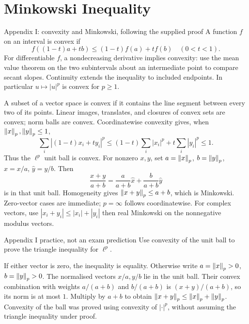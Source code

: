 \clearpage
\section{Minkowski Inequality}
\begin{note}{Appendix I: convexity and Minkowski, following the supplied proof}
A function $f$ on an interval is convex if
\[f((1-t)a+tb)\le(1-t)f(a)+tf(b)\quad(0<t<1).\]
For differentiable $f$, a nondecreasing derivative implies convexity: use the mean value theorem on the two subintervals about an intermediate point to compare secant slopes. Continuity extends the inequality to included endpoints. In particular $u\mapsto|u|^p$ is convex for $p\ge1$.

A subset of a vector space is convex if it contains the line segment between every two of its points. Linear images, translates, and closures of convex sets are convex; norm balls are convex. Coordinatewise convexity gives, when $\left\lVert x\right\rVert_p,\left\lVert y\right\rVert_p\le1$,
\[\sum_i|(1-t)x_i+ty_i|^p\le(1-t)\sum_i|x_i|^p+t\sum_i|y_i|^p\le1.\]
Thus the $\ell^p$ unit ball is convex. For nonzero $x,y$, set $a=\left\lVert x\right\rVert_p$, $b=\left\lVert y\right\rVert_p$, $\widehat x=x/a$, $\widehat y=y/b$. Then
\[\frac{x+y}{a+b}=\frac a{a+b}\widehat x+\frac b{a+b}\widehat y\]
is in that unit ball. Homogeneity gives $\left\lVert x+y\right\rVert_p\le a+b$, which is Minkowski. Zero-vector cases are immediate; $p=\infty$ follows coordinatewise. For complex vectors, use $|x_i+y_i|\le|x_i|+|y_i|$ then real Minkowski on the nonnegative modulus vectors.
\end{note}
\begin{exam}{Appendix I practice, not an exam prediction}
Use convexity of the unit ball to prove the triangle inequality for $\ell^p$.
\end{exam}
\begin{answer}
If either vector is zero, the inequality is equality. Otherwise write $a=\left\lVert x\right\rVert_p>0$, $b=\left\lVert y\right\rVert_p>0$. The normalised vectors $x/a,y/b$ lie in the unit ball. Their convex combination with weights $a/(a+b)$ and $b/(a+b)$ is $(x+y)/(a+b)$, so its norm is at most $1$. Multiply by $a+b$ to obtain $\left\lVert x+y\right\rVert_p\le\left\lVert x\right\rVert_p+\left\lVert y\right\rVert_p$. Convexity of the ball was proved using convexity of $|\cdot|^p$, without assuming the triangle inequality under proof.
\end{answer}
